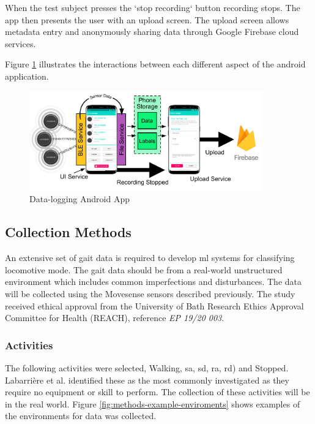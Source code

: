 When the test subject presses the `stop recording` button recording stops. The app then presents the user with an upload screen. The upload screen allows metadata entry and anonymously sharing data through Google Firebase cloud services.

Figure \ref{fig:methods-android-app} illustrates the interactions between each different aspect of the android application.

\begin{figure}[hbt]
    \centering
    \includegraphics[width=0.9\textwidth]{content/3-Methods/Android_App.pdf}
    \caption{Data-logging Android App}
    \label{fig:methods-android-app}
\end{figure}


\subsection{Collection Methods}
\label{sec:methods-data-collection}
An extensive set of gait data is required to develop \acrshort{ml} systems for classifying locomotive mode. The gait data should be from a real-world unstructured environment which includes common imperfections and disturbances. The data will be collected using the Movesense sensors described previously. The study received ethical approval from the University of Bath Research Ethics Approval Committee for Health (REACH), reference \textit{EP 19/20 003}.

\subsubsection{Activities}
The following activities were selected, Walking, \acrfull{sa}, \acrfull{sd}, \acrfull{ra}, \acrfull{rd}) and Stopped. Labarri\`ere et al. identified these as the most commonly investigated as they require no equipment or skill to perform\cite{Labarriere2020}. The collection of these activities will be in the real world. Figure \ref{fig:methods-example-enviroments} shows examples of the environments for data was collected.

